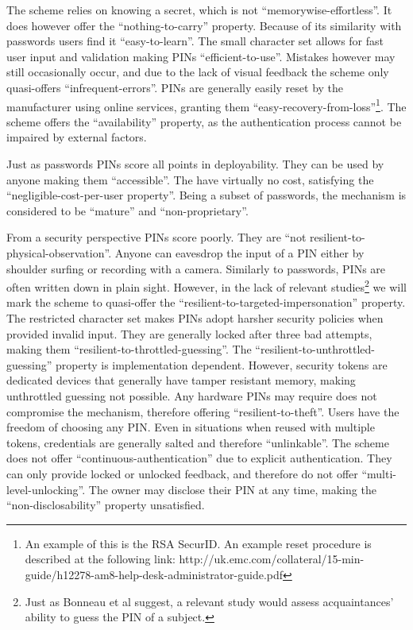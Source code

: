 	The scheme relies on knowing a secret, which is not ``memorywise-effortless''. It does however offer the ``nothing-to-carry'' property. Because of its similarity with passwords users find it ``easy-to-learn''. The small character set allows for fast user input and validation making PINs ``efficient-to-use''. Mistakes however may still occasionally occur, and due to the lack of visual feedback the scheme only quasi-offers ``infrequent-errors''. PINs are generally easily reset by the manufacturer using online services, granting them ``easy-recovery-from-loss''\footnote{An example of this is the RSA SecurID. An example reset procedure is described at the following link: http://uk.emc.com/collateral/15-min-guide/h12278-am8-help-desk-administrator-guide.pdf}. The scheme offers the ``availability'' property, as the authentication process cannot be impaired by external factors.
	
	Just as passwords PINs score all points in deployability. They can be used by anyone making them ``accessible''. The have virtually no cost, satisfying the ``negligible-cost-per-user property''. Being a subset of passwords, the mechanism is considered to be ``mature'' and ``non-proprietary''.
	
	From a security perspective PINs score poorly. They are ``not resilient-to-physical-observation''. Anyone can eavesdrop the input of a PIN either by shoulder surfing or recording with a camera. Similarly to passwords, PINs are often written down in plain sight. However, in the lack of relevant studies\footnote{Just as Bonneau et al suggest, a relevant study would assess acquaintances' ability to guess the PIN of a subject.} we will mark the scheme to quasi-offer the ``resilient-to-targeted-impersonation'' property. The restricted character set makes PINs adopt harsher security policies when provided invalid input. They are generally locked after three bad attempts, making them ``resilient-to-throttled-guessing''. The ``resilient-to-unthrottled-guessing'' property is implementation dependent. However, security tokens are dedicated devices that generally have tamper resistant memory, making unthrottled guessing not possible. Any hardware PINs may require does not compromise the mechanism, therefore offering ``resilient-to-theft''. Users have the freedom of choosing any PIN. Even in situations when reused with multiple tokens, credentials are generally salted and therefore ``unlinkable''. The scheme does not offer ``continuous-authentication'' due to explicit authentication. They can only provide locked or unlocked feedback, and therefore do not offer ``multi-level-unlocking''. The owner may disclose their PIN at any time, making the ``non-disclosability'' property unsatisfied. 
	
